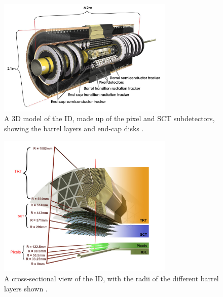 \begin{figure}[!htpb]
  \centering
  \includegraphics[width=0.75\textwidth]{chapters/2.detector/figs/atlas_id.jpg}
  \caption{
    A 3D model of the \ATLAS ID, made up of the pixel and SCT subdetectors, showing the barrel layers and end-cap disks \cite{atlasid}.
  }
  \label{fig:atlas_id_run1}
\end{figure}
%
\begin{figure}[!htpb]
  \centering
  \includegraphics[width=0.75\textwidth]{chapters/2.detector/figs/atlas_id_xs.png}
  \caption{A cross-sectional view of the \ATLAS ID, with the radii of the different barrel layers shown \cite{atlastrackingdocs}.}
  \label{fig:atlas_id_run2}
\end{figure}
%

